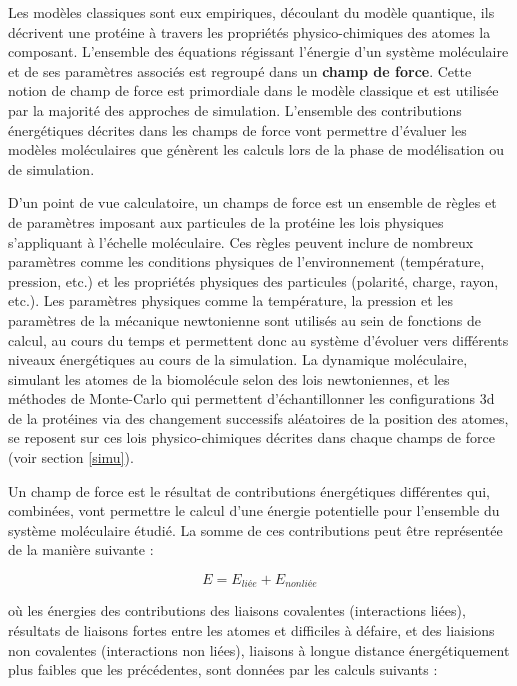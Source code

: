  \label{forcefield}

Les modèles classiques sont eux empiriques, découlant du modèle quantique, ils décrivent une protéine à travers les propriétés physico-chimiques des atomes la composant. L'ensemble des équations régissant l'énergie d'un système moléculaire et de ses paramètres associés est regroupé dans un \textbf{champ de force}. Cette notion de champ de force est primordiale dans le modèle classique et est utilisée par la majorité des approches de simulation. L'ensemble des contributions énergétiques décrites dans les champs de force vont permettre d'évaluer les modèles moléculaires que génèrent les calculs lors de la phase de modélisation ou de simulation.

D'un point de vue calculatoire, un champs de force est un ensemble de règles et de paramètres imposant aux particules de la protéine les lois physiques s'appliquant à l'échelle moléculaire. Ces règles peuvent inclure de nombreux paramètres comme les conditions physiques de l'environnement (température, pression, etc.) et les propriétés physiques des particules (polarité, charge, rayon, etc.). Les paramètres physiques comme la température, la pression et les paramètres de la mécanique newtonienne sont utilisés au sein de fonctions de calcul, au cours du temps et permettent donc au système d'évoluer vers différents niveaux énergétiques au cours de la simulation. La dynamique moléculaire, simulant les atomes de la biomolécule selon des lois newtoniennes, 
et les méthodes de Monte-Carlo qui permettent d'échantillonner les configurations 3d de la protéines via des changement successifs aléatoires de la position des atomes, se reposent sur ces lois physico-chimiques décrites dans chaque champs de force (voir section \ref{simu}). 

Un champ de force est le résultat de contributions énergétiques différentes qui, combinées, vont permettre le calcul d'une énergie potentielle pour l'ensemble du système moléculaire étudié. La somme de ces contributions peut être représentée de la manière suivante :

$$E = E_{liée} + E_{nonliée}$$

où les énergies des contributions des liaisons covalentes (interactions liées), résultats de liaisons fortes entre les atomes et difficiles à défaire, et des liaisions non covalentes (interactions non liées), liaisons à longue distance énergétiquement plus faibles que les précédentes, sont données par les calculs suivants :

